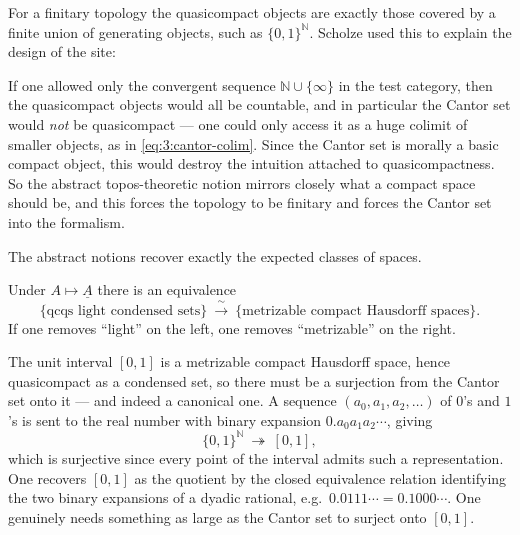 For a finitary topology the quasicompact objects are exactly those covered by a
finite union of generating objects, such as $\{0,1\}^{\mathbb{N}}$. Scholze used
this to explain the design of the site:

\begin{remark}
\label{rmk:3:need-cantor}
If one allowed only the convergent sequence $\mathbb{N}\cup\{\infty\}$ in the
test category, then the quasicompact objects would all be countable, and in
particular the Cantor set would \emph{not} be quasicompact --- one could only
access it as a huge colimit of smaller objects, as in \eqref{eq:3:cantor-colim}.
Since the Cantor set is morally a basic compact object, this would destroy the
intuition attached to quasicompactness. So the abstract topos-theoretic notion
mirrors closely what a compact space should be, and this forces the topology to
be finitary and forces the Cantor set into the formalism.
\end{remark}

The abstract notions recover exactly the expected classes of spaces.

\begin{proposition}
\label{prop:3:qcqs}
Under $A\mapsto\underline{A}$ there is an equivalence
\begin{equation*}
\{\text{qcqs light condensed sets}\}\ \xrightarrow{\ \sim\ }\
\{\text{metrizable compact Hausdorff spaces}\}.
\end{equation*}
If one removes ``light'' on the left, one removes ``metrizable'' on the right.
\end{proposition}

\begin{example}
\label{ex:3:interval-cantor}
The unit interval $[0,1]$ is a metrizable compact Hausdorff space, hence
quasicompact as a condensed set, so there must be a surjection from the Cantor
set onto it --- and indeed a canonical one. A sequence $(a_0,a_1,a_2,\dots)$ of
$0$'s and $1$'s is sent to the real number with binary expansion
$0.a_0a_1a_2\cdots$, giving
\begin{equation*}
\{0,1\}^{\mathbb{N}}\ \twoheadrightarrow\ [0,1],
\end{equation*}
which is surjective since every point of the interval admits such a
representation. One recovers $[0,1]$ as the quotient by the closed equivalence
relation identifying the two binary expansions of a dyadic rational, e.g.\
$0.0111\cdots=0.1000\cdots$. One genuinely needs something as large as the
Cantor set to surject onto $[0,1]$.
\end{example}

